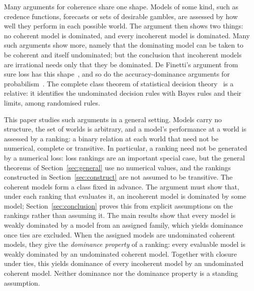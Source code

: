 \documentclass[11pt]{article}
\theoremstyle{definition}
\theoremstyle{remark}
\begin{document}
Many arguments for coherence share one shape. Models of some kind, such as credence functions, forecasts or sets of desirable gambles, are assessed by how well they perform in each possible world. The argument then shows two things: no coherent model is dominated, and every incoherent model is dominated. Many such arguments show more, namely that the dominating model can be taken to be coherent and itself undominated; but the conclusion that incoherent models are irrational needs only that they be dominated. De Finetti's argument from sure loss has this shape~\cite{deFinetti}, and so do the accuracy-dominance arguments for probabilism~\cite{Joyce,Predd,SSK09,Pettigrew,Nielsen}. The complete class theorem of statistical decision theory~\cite{Wald} is a relative: it identifies the undominated decision rules with Bayes rules and their limits, among randomised rules.

This paper studies such arguments in a general setting. Models carry no structure, the set of worlds is arbitrary, and a model's performance at a world is assessed by a ranking: a binary relation at each world that need not be numerical, complete or transitive. In particular, a ranking need not be generated by a numerical loss: loss rankings are an important special case, but the general theorems of Section~\ref{sec:general} use no numerical values, and the rankings constructed in Section~\ref{sec:construct} are not assumed to be transitive. The coherent models form a class fixed in advance. The argument must show that, under each ranking that evaluates it, an incoherent model is dominated by some model; Section~\ref{sec:conclusion} proves this from explicit assumptions on the rankings rather than assuming it. The main results show that every model is weakly dominated by a model from an assigned family, which yields dominance once ties are excluded. When the assigned models are undominated coherent models, they give the \emph{dominance property} of a ranking: every evaluable model is weakly dominated by an undominated coherent model. Together with closure under ties, this yields dominance of every incoherent model by an undominated coherent model. Neither dominance nor the dominance property is a standing assumption.
\end{document}
